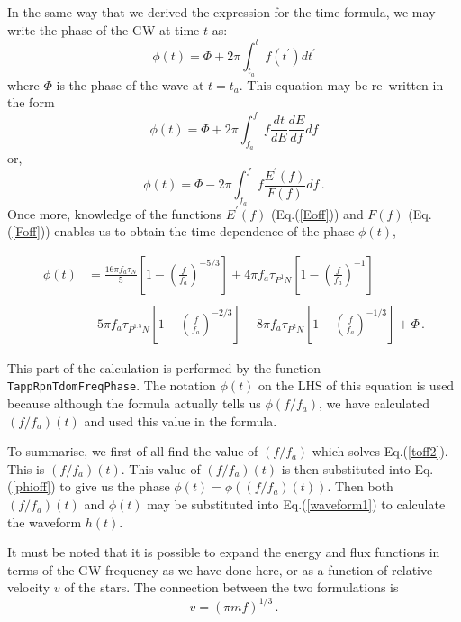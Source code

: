 \documentclass[12pt]{article}
\begin{document}
In the same way that we derived the expression for the time formula, we may write the phase of the GW at time $t$ as:
\begin{equation}
\phi(t) = \Phi + 2 \pi \int^{t}_{t_{a}} f(t^{\prime}) dt^{\prime}
\end{equation}
where $\Phi$ is the phase of the wave at $t=t_{a}$. This equation may be re--written in the form
\begin{equation}
\phi(t) = \Phi + 2 \pi \int^{f}_{f_{a}} f \frac{dt}{dE} \frac{dE}{df} df
\end{equation}
or,
\begin{equation}
\phi(t) = \Phi - 2 \pi \int^{f}_{f_{a}} f \frac{E^{\prime}(f)}{F(f)} df \,.
\end{equation}
Once more, knowledge of the functions $E^{\prime}(f)$ (Eq.(\ref{Eoff})) and $F(f)$ (Eq.(\ref{Foff})) enables us to obtain the time dependence of the phase $\phi(t)$,

\begin{equation}
\begin{split}
\phi(t) & = \frac{16 \pi f_{a} \tau_{N}}{5} \left[ 1 - \left( \frac{f}{f_{a}} \right)^{-5/3} \right] + 4 \pi f_{a}\tau_{P^{1}N} \left[ 1 - \left( \frac{f}{f_{a}} \right)^{-1} \right]  \\
        &     \\
        & - 5 \pi f_{a} \tau_{P^{1.5}N} \left[ 1 - \left( \frac{f}{f_{a}} \right)^{-2/3} \right] + 8 \pi f_{a} \tau_{P^{2}N} \left[ 1 - \left( \frac{f}{f_{a}} \right)^{-1/3} \right] + \Phi \,.
\end{split}
\label{phioff}
\end{equation}

This part of the calculation is performed by the function \\ \texttt{TappRpnTdomFreqPhase}. The notation $\phi(t)$ on the LHS of this equation is used because although the formula actually tells us $\phi(f/f_{a})$, we have calculated $(f/f_{a})(t)$ and used this value in the formula.

To summarise, we first of all find the value of $(f/f_{a})$ which solves Eq.(\ref{toff2}). This is $(f/f_{a})(t)$. This value of $(f/f_{a})(t)$ is then substituted into Eq.(\ref{phioff}) to give us the phase $\phi(t) = \phi((f/f_{a})(t))$. Then both $(f/f_{a})(t)$ and $\phi(t)$ may be substituted into Eq.(\ref{waveform1}) to calculate the waveform $h(t)$.

It must be noted that it is possible to expand the energy and flux functions in terms of the GW frequency as we have done here, or as a function of relative velocity $v$ of the stars. The connection between the two formulations is
\begin{equation}
v = (\pi m f)^{1/3} \,.
\end{equation}
\end{document}
